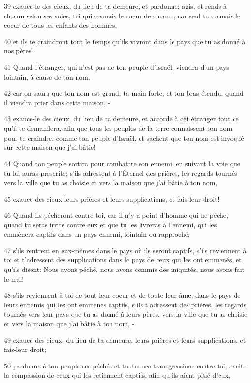 \par 39 exauce-le des cieux, du lieu de ta demeure, et pardonne; agis, et rends à chacun selon ses voies, toi qui connais le coeur de chacun, car seul tu connais le coeur de tous les enfants des hommes,
\par 40 et ils te craindront tout le temps qu'ils vivront dans le pays que tu as donné à nos pères!
\par 41 Quand l'étranger, qui n'est pas de ton peuple d'Israël, viendra d'un pays lointain, à cause de ton nom,
\par 42 car on saura que ton nom est grand, ta main forte, et ton bras étendu, quand il viendra prier dans cette maison, -
\par 43 exauce-le des cieux, du lieu de ta demeure, et accorde à cet étranger tout ce qu'il te demandera, afin que tous les peuples de la terre connaissent ton nom pour te craindre, comme ton peuple d'Israël, et sachent que ton nom est invoqué sur cette maison que j'ai bâtie!
\par 44 Quand ton peuple sortira pour combattre son ennemi, en suivant la voie que tu lui auras prescrite; s'ils adressent à l'Éternel des prières, les regards tournés vers la ville que tu as choisie et vers la maison que j'ai bâtie à ton nom,
\par 45 exauce des cieux leurs prières et leurs supplications, et fais-leur droit!
\par 46 Quand ils pécheront contre toi, car il n'y a point d'homme qui ne pèche, quand tu seras irrité contre eux et que tu les livreras à l'ennemi, qui les emmènera captifs dans un pays ennemi, lointain ou rapproché;
\par 47 s'ils rentrent en eux-mêmes dans le pays où ils seront captifs, s'ils reviennent à toi et t'adressent des supplications dans le pays de ceux qui les ont emmenés, et qu'ils disent: Nous avons péché, nous avons commis des iniquités, nous avons fait le mal!
\par 48 s'ils reviennent à toi de tout leur coeur et de toute leur âme, dans le pays de leurs ennemis qui les ont emmenés captifs, s'ils t'adressent des prières, les regards tournés vers leur pays que tu as donné à leurs pères, vers la ville que tu as choisie et vers la maison que j'ai bâtie à ton nom, -
\par 49 exauce des cieux, du lieu de ta demeure, leurs prières et leurs supplications, et fais-leur droit;
\par 50 pardonne à ton peuple ses péchés et toutes ses transgressions contre toi; excite la compassion de ceux qui les retiennent captifs, afin qu'ils aient pitié d'eux,
